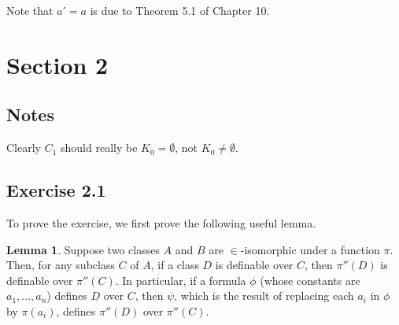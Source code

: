 \documentclass{article}
\theoremstyle{definition}
\newtheorem{lemma}[theorem]{Lemma}
\begin{document}
Note that $a'=a$ is due to Theorem 5.1 of Chapter 10.

\section*{Section 2}

\subsection*{Notes}
Clearly $C_1$ should really be $K_0=\emptyset$, not $K_0\ne\emptyset$.

\subsection*{Exercise 2.1}
To prove the exercise, we first prove the following useful lemma.

\begin{lemma}
Suppose two classes $A$ and $B$ are $\in$-isomorphic under a function $\pi$. Then, for any subclass $C$ of $A$, if 
a class $D$ is definable over $C$, then $\pi''(D)$ is definable over $\pi''(C)$. In particular, if a formula 
$\phi$ (whose constants are $a_1,...,a_n$) defines $D$ over $C$, then $\psi$, which is the result of replacing 
each $a_i$ in $\phi$ by $\pi(a_i)$, defines $\pi''(D)$ over $\pi''(C)$.
\end{lemma}
\end{document}
